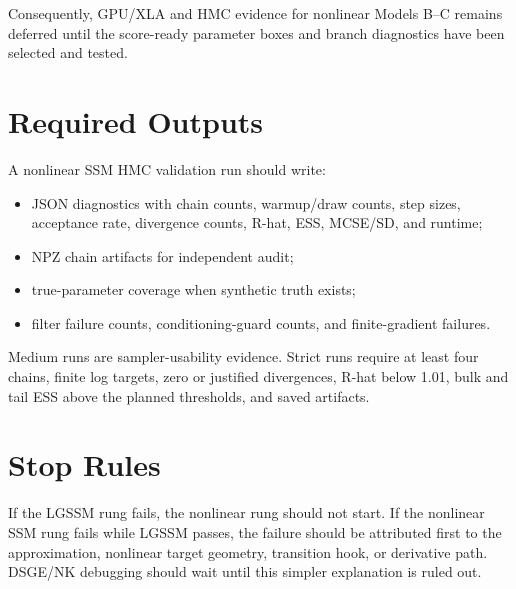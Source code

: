 Consequently, GPU/XLA and HMC evidence for nonlinear Models B--C remains
deferred until the score-ready parameter boxes and branch diagnostics have
been selected and tested.

\section{Required Outputs}
\label{sec:bf-nonlinear-required-outputs}

A nonlinear SSM HMC validation run should write:
\begin{itemize}
  \item JSON diagnostics with chain counts, warmup/draw counts, step sizes,
    acceptance rate, divergence counts, R-hat, ESS, MCSE/SD, and runtime;
  \item NPZ chain artifacts for independent audit;
  \item true-parameter coverage when synthetic truth exists;
  \item filter failure counts, conditioning-guard counts, and finite-gradient
    failures.
\end{itemize}
Medium runs are sampler-usability evidence.  Strict runs require at least four
chains, finite log targets, zero or justified divergences, R-hat below 1.01,
bulk and tail ESS above the planned thresholds, and saved artifacts.

\section{Stop Rules}
\label{sec:bf-nonlinear-stop-rules}

If the LGSSM rung fails, the nonlinear rung should not start.  If the nonlinear
SSM rung fails while LGSSM passes, the failure should be attributed first to
the approximation, nonlinear target geometry, transition hook, or derivative
path.  DSGE/NK debugging should wait until this simpler explanation is ruled
out.

